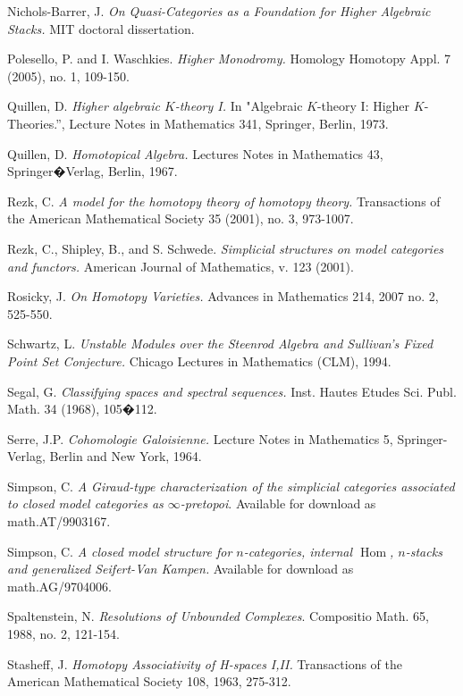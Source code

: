 \documentclass{report}[10pt, final]
\DeclareMathOperator{\Hom}{Hom} \DeclareMathOperator{\bP}{\beta P}
\theoremstyle{definition}
\begin{document}
\begin{EndMatter}
\begin{thebibliography}{99}
 Nichols-Barrer, J. {\it On Quasi-Categories as a Foundation for Higher Algebraic Stacks.} MIT doctoral dissertation.

 Polesello, P. and I. Waschkies. {\it Higher Monodromy.} Homology Homotopy Appl. 7 (2005), no. 1, 109-150.

 Quillen, D. {\it Higher algebraic $K$-theory I.} In "Algebraic $K$-theory I: Higher $K$-Theories.'', Lecture Notes in Mathematics 341, Springer, Berlin, 1973.

 Quillen, D. {\it Homotopical Algebra.} Lectures Notes in Mathematics 43, Springer�Verlag, Berlin, 1967. 

 Rezk, C. {\it A model for the homotopy theory of homotopy theory.} Transactions of the American Mathematical Society 35 (2001), no. 3, 973-1007.

 Rezk, C., Shipley, B., and S. Schwede. {\it Simplicial structures on model categories and functors.} American Journal of Mathematics, v. 123 (2001).

 Rosicky, J. {\it On Homotopy Varieties.} Advances in Mathematics
214, 2007 no. 2, 525-550.

 Schwartz, L. {\it Unstable Modules over the Steenrod Algebra and Sullivan's Fixed Point Set Conjecture.} Chicago Lectures in Mathematics (CLM), 1994.

 Segal, G. {\it Classifying spaces and spectral sequences.} 
Inst. Hautes Etudes Sci. Publ. Math. 34 (1968), 105�112. 

 Serre, J.P. {\it Cohomologie Galoisienne.}
Lecture Notes in Mathematics 5, Springer-Verlag, Berlin and New
York, 1964.

 Simpson, C. {\it A Giraud-type characterization of the
simplicial categories associated to closed model categories as
$\infty$-pretopoi}. Available for download as math.AT/9903167.

 Simpson, C. {\it A closed model structure for $n$-categories, internal
$\Hom$, $n$-stacks and generalized Seifert-Van Kampen.} Available for download as
math.AG/9704006.

 Spaltenstein, N. {\it Resolutions of Unbounded
Complexes}. Compositio Math. 65, 1988, no. 2, 121-154.

 Stasheff, J. {\it Homotopy Associativity of
H-spaces I,II.} Transactions of the American Mathematical Society
108, 1963, 275-312.


\end{thebibliography}
\end{EndMatter}
\end{document}
